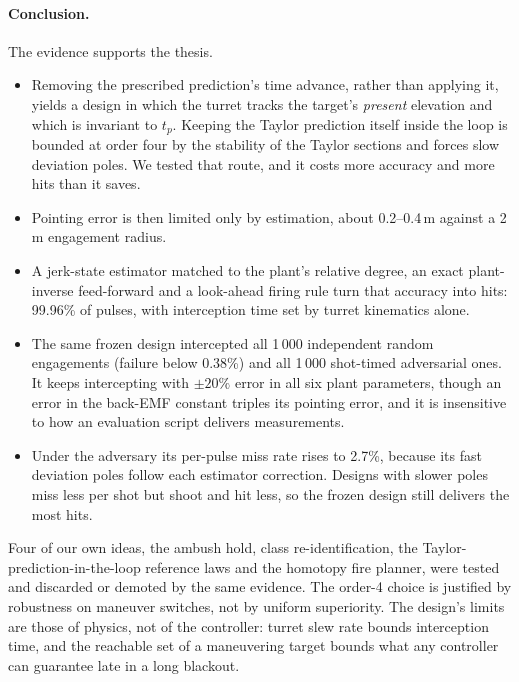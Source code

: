 \documentclass[11pt,a4paper]{article}
\begin{document}
\paragraph{Conclusion.} The evidence supports the thesis.
\begin{itemize}
\item Removing the prescribed prediction's time advance, rather than applying it, yields a design in which the turret tracks the target's \emph{present} elevation and which is invariant to $t_p$. Keeping the Taylor prediction itself inside the loop is bounded at order four by the stability of the Taylor sections and forces slow deviation poles. We tested that route, and it costs more accuracy and more hits than it saves.
\item Pointing error is then limited only by estimation, about 0.2--0.4\,m against a 2\,m engagement radius.
\item A jerk-state estimator matched to the plant's relative degree, an exact plant-inverse feed-forward and a look-ahead firing rule turn that accuracy into hits: 99.96\% of pulses, with interception time set by turret kinematics alone.
\item The same frozen design intercepted all 1\,000 independent random engagements (failure below 0.38\%) and all 1\,000 shot-timed adversarial ones. It keeps intercepting with $\pm20\%$ error in all six plant parameters, though an error in the back-EMF constant triples its pointing error, and it is insensitive to how an evaluation script delivers measurements.
\item Under the adversary its per-pulse miss rate rises to 2.7\%, because its fast deviation poles follow each estimator correction. Designs with slower poles miss less per shot but shoot and hit less, so the frozen design still delivers the most hits.
\end{itemize}
Four of our own ideas, the ambush hold, class re-identification, the Taylor-prediction-in-the-loop reference laws and the homotopy fire planner, were tested and discarded or demoted by the same evidence. The order-4 choice is justified by robustness on maneuver switches, not by uniform superiority. The design's limits are those of physics, not of the controller: turret slew rate bounds interception time, and the reachable set of a maneuvering target bounds what any controller can guarantee late in a long blackout.




\appendix
\end{document}

